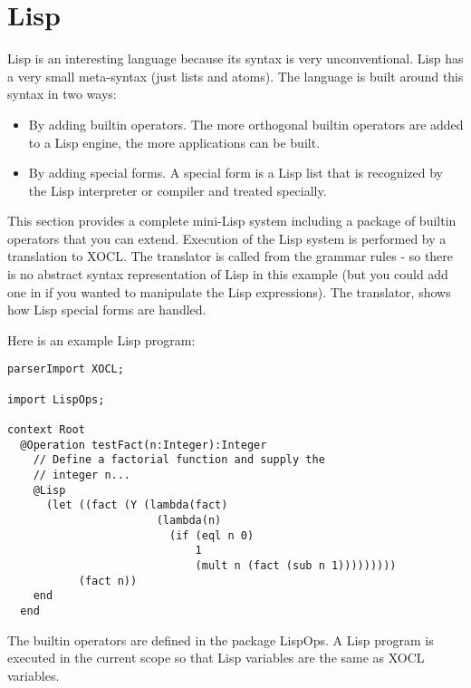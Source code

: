 \section{Lisp}

Lisp is an interesting language because its syntax is very unconventional.
Lisp has a very small meta-syntax (just lists and atoms). The language is
built around this syntax in two ways:
\begin{itemize}
\item By adding builtin operators. The more orthogonal builtin operators are
added to a Lisp engine, the more applications can be built. 
\item By adding special forms. A special form is a Lisp list that
is recognized by the Lisp interpreter or compiler and treated specially.
\end{itemize}
This section provides a complete mini-Lisp system including a package of
builtin operators that you can extend. Execution of the Lisp system is
performed by a translation to XOCL. The translator is called from the grammar
rules - so there is no abstract syntax representation of Lisp in this example
(but you could add one in if you wanted to manipulate the Lisp expressions).
The translator, shows how Lisp special forms are handled.

Here is an example Lisp program:
\begin{lstlisting}
parserImport XOCL;

import LispOps;

context Root
  @Operation testFact(n:Integer):Integer
    // Define a factorial function and supply the 
    // integer n...
    @Lisp
      (let ((fact (Y (lambda(fact)
                       (lambda(n)
                         (if (eql n 0)
                             1
                             (mult n (fact (sub n 1)))))))))
           (fact n))
    end
  end
\end{lstlisting}
The builtin operators are defined in the package LispOps. A Lisp
program is executed in the current scope so that Lisp variables 
are the same as XOCL variables.

